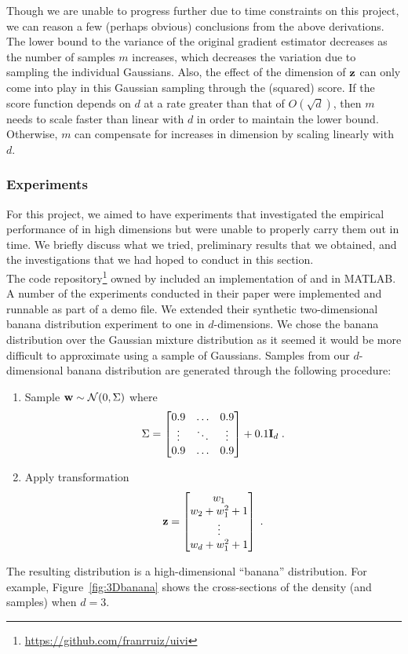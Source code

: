 \documentclass[10pt]{article}
\begin{document}
Though we are unable to progress further due to time constraints on this project, we can reason a few (perhaps obvious) conclusions from the above derivations. The lower bound to the variance of the original gradient estimator decreases as the number of samples $m$ increases, which decreases the variation due to sampling the individual Gaussians. Also, the effect of the dimension of $\mathbf{z}$ can only come into play in this Gaussian sampling through the (squared) score. If the score function depends on $d$ at a rate greater than that of $O(\sqrt{d})$, then $m$ needs to scale faster than linear with $d$ in order to maintain the lower bound. Otherwise, $m$ can compensate for increases in dimension by scaling linearly with $d$.


\subsubsection{Experiments}

For this project, we aimed to have experiments that investigated the empirical performance of \uivi in high dimensions but were unable to properly carry them out in time. We briefly discuss what we tried, preliminary results that we obtained, and the investigations that we had hoped to conduct in this section.
\\

The code repository\footnote{\url{https://github.com/franrruiz/uivi}} owned by \citeauthor{Titsias:2019} included an implementation of \uivi and \sivi in MATLAB. A number of the experiments conducted in their paper were implemented and runnable as part of a \uivi demo file. We extended their synthetic two-dimensional banana distribution experiment to one in $d$-dimensions. We chose the banana distribution over the Gaussian mixture distribution as it seemed it would be more difficult to approximate using a sample of Gaussians. Samples from our $d$-dimensional banana distribution are generated through the following procedure:
\begin{enumerate}
\item
Sample $\mathbf{w}\sim\mathcal{N}(0,\Sigma)$ where
\[
\Sigma =
\begin{bmatrix}
0.9 & \ldots & 0.9 \\
\vdots & \ddots & \vdots \\
0.9 & \ldots & 0.9
\end{bmatrix}
+ 0.1\mathbf{I}_d \;.
\]
\item
Apply transformation
\[
\mathbf{z} = \begin{bmatrix}
w_1 \\
w_2 + w_1^2 + 1 \\
\vdots \\
w_d + w_1^2 + 1
\end{bmatrix} \;.
\]
\end{enumerate}
The resulting distribution is a high-dimensional ``banana'' distribution. For example, Figure~\ref{fig:3Dbanana} shows the cross-sections of the density (and samples) when $d=3$.
\\
\end{document}
